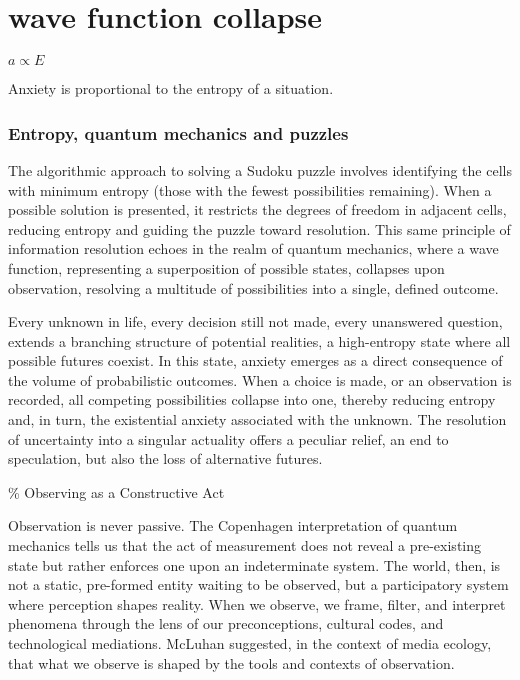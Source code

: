 \chapter*{wave function collapse}
\begin{center}
\vspace{2cm}
\begin{flushright}
\large
\textit{ $a \propto E$ }
\end{flushright}
\vspace{2cm}
\end{center}
\normalsize

Anxiety is proportional to the entropy of a situation. 

\newpage  
\subsection*{ Entropy, quantum mechanics and puzzles} 

% 
The algorithmic approach to solving a Sudoku puzzle involves identifying the cells with minimum entropy (those with the fewest possibilities remaining). When a possible solution is presented, it restricts the degrees of freedom in adjacent cells, reducing entropy and guiding the puzzle toward resolution. This same principle of information resolution echoes in the realm of quantum mechanics, where a wave function, representing a superposition of possible states, collapses upon observation, resolving a multitude of possibilities into a single, defined outcome.

Every unknown in life, every decision still not made, every unanswered question, extends a branching structure of potential realities, a high-entropy state where all possible futures coexist. In this state, anxiety emerges as a direct consequence of the volume of probabilistic outcomes. When a choice is made, or an observation is recorded, all competing possibilities collapse into one, thereby reducing entropy and, in turn, the existential anxiety associated with the unknown. The resolution of uncertainty into a singular actuality offers a peculiar relief, an end to speculation, but also the loss of alternative futures.

{\scriptsize \textcolor{comment}{\%  Observing as a Constructive Act }}

Observation is never passive.  The Copenhagen interpretation of quantum mechanics tells us that the act of measurement does not reveal a pre-existing state but rather enforces one upon an indeterminate system. The world, then, is not a static, pre-formed entity waiting to be observed, but a participatory system where perception shapes reality. When we observe, we frame, filter, and interpret phenomena through the lens of our preconceptions, cultural codes, and technological mediations. McLuhan suggested, in the context of media ecology, that what we observe is shaped by the tools and contexts of observation. \citep{mcluhan1964}

